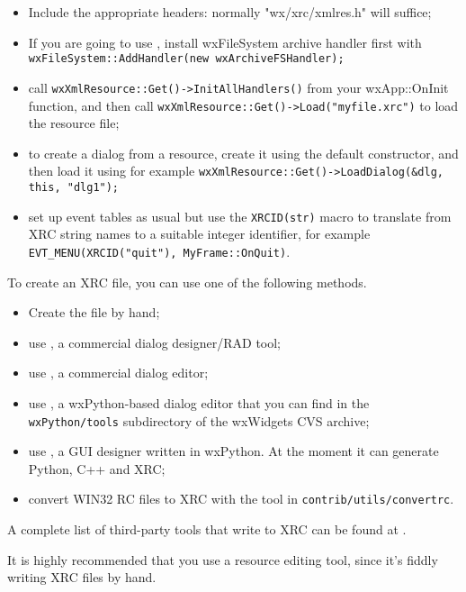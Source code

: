 \begin{itemize}\itemsep=0pt
\item Include the appropriate headers: normally "wx/xrc/xmlres.h" will suffice;
\item If you are going to use , install
wxFileSystem archive handler first with {\tt wxFileSystem::AddHandler(new wxArchiveFSHandler);}
\item call {\tt wxXmlResource::Get()->InitAllHandlers()} from your wxApp::OnInit function,
and then call {\tt wxXmlResource::Get()->Load("myfile.xrc")} to load the resource file;
\item to create a dialog from a resource, create it using the default constructor, and then
load it using for example {\tt wxXmlResource::Get()->LoadDialog(\&dlg, this, "dlg1");}
\item set up event tables as usual but use the {\tt XRCID(str)} macro to translate from XRC string names
to a suitable integer identifier, for example {\tt EVT\_MENU(XRCID("quit"), MyFrame::OnQuit)}.
\end{itemize}

To create an XRC file, you can use one of the following methods.

\begin{itemize}\itemsep=0pt
\item Create the file by hand;
\item use , a commercial dialog designer/RAD tool;
\item use , a commercial dialog editor;
\item use , a wxPython-based
dialog editor that you can find in the {\tt wxPython/tools} subdirectory of the wxWidgets
CVS archive;
\item use , a GUI designer written in wxPython. At the moment it can generate Python, C++ and XRC;
\item convert WIN32 RC files to XRC with the tool in {\tt contrib/utils/convertrc}.
\end{itemize}

A complete list of third-party tools that write to XRC can be found at .

It is highly recommended that you use a resource editing tool, since it's fiddly writing
XRC files by hand.

